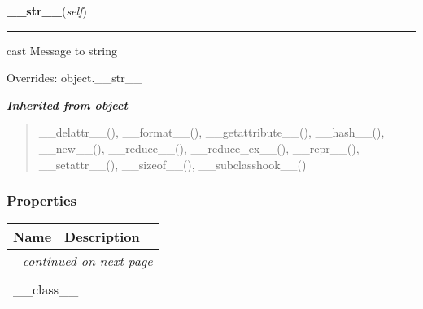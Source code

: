     \vspace{0.5ex}

\hspace{.8\funcindent}\begin{boxedminipage}{\funcwidth}

    \raggedright \textbf{\_\_str\_\_}(\textit{self})

    \vspace{-1.5ex}

    \rule{\textwidth}{0.5\fboxrule}
\setlength{\parskip}{2ex}
    cast Message to string

\setlength{\parskip}{1ex}
      Overrides: object.\_\_str\_\_

    \end{boxedminipage}


\large{\textbf{\textit{Inherited from object}}}

\begin{quote}
\_\_delattr\_\_(), \_\_format\_\_(), \_\_getattribute\_\_(), \_\_hash\_\_(), \_\_new\_\_(), \_\_reduce\_\_(), \_\_reduce\_ex\_\_(), \_\_repr\_\_(), \_\_setattr\_\_(), \_\_sizeof\_\_(), \_\_subclasshook\_\_()
\end{quote}


  \subsubsection{Properties}

    \vspace{-1cm}
\hspace{\varindent}\begin{longtable}{|p{\varnamewidth}|p{\vardescrwidth}|l}
\cline{1-2}
\cline{1-2} \centering \textbf{Name} & \centering \textbf{Description}& \\
\cline{1-2}
\endhead\cline{1-2}\multicolumn{3}{r}{\small\textit{continued on next page}}\\\endfoot\cline{1-2}
\endlastfoot\multicolumn{2}{|l|}{\textit{Inherited from object}}\\
\multicolumn{2}{|p{\varwidth}|}{\raggedright \_\_class\_\_}\\
\cline{1-2}
\end{longtable}


